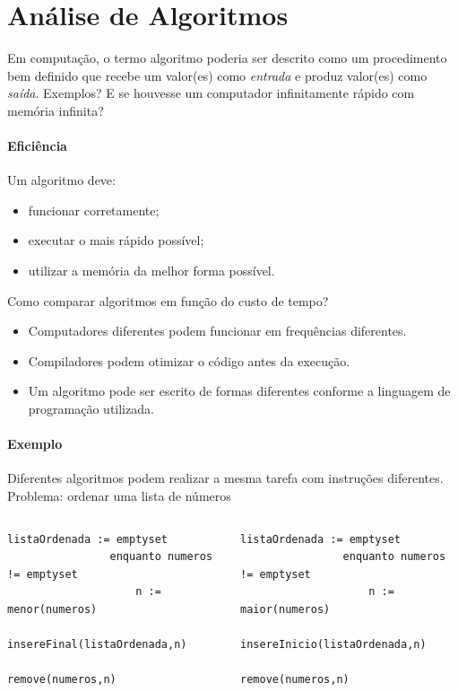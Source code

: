 \section{Análise de Algoritmos}%
\begin{frame}[label=main]
	Em computação, o termo \alert{algoritmo} poderia ser descrito como um procedimento 
	bem definido que recebe um valor(es) como \emph{entrada} e produz valor(es)
	como \emph{saída}.
	\vfill\pause
	Exemplos?
	\vfill\pause
	E se houvesse um computador infinitamente rápido com memória infinita?
\end{frame}

\begin{frame}[label=main]
	\framesubtitle{Eficiência}

	Um algoritmo deve:
	\begin{itemize}
		\item funcionar corretamente;
		\item executar o mais rápido possível;
		\item utilizar a memória da melhor forma possível.
	\end{itemize}
	\vfill\pause
	Como comparar algoritmos em função do custo de tempo?
	\begin{itemize}
		\item Computadores diferentes podem funcionar em frequências diferentes.
		\item Compiladores podem otimizar o código antes da execução.
		\item Um algoritmo pode ser escrito de formas diferentes conforme a 
		linguagem de programação utilizada.
	\end{itemize}
\end{frame}

\begin{frame}[fragile,label=graduacao]
	\framesubtitle{Exemplo}

	Diferentes algoritmos podem realizar a mesma tarefa com instruções diferentes.
	\vfill
	Problema: ordenar uma lista de números
	\vfill\pause
	\begin{columns}[T]
			\begin{lstlisting}[morekeywords={menor,insereFinal,remove}]
				listaOrdenada := emptyset
				enquanto numeros != emptyset
				    n := menor(numeros)
				    insereFinal(listaOrdenada,n)
				    remove(numeros,n)
			\end{lstlisting}
			\begin{lstlisting}[morekeywords={maior,insereInicio,remove}]
				listaOrdenada := emptyset
				enquanto numeros != emptyset
				    n := maior(numeros)
				    insereInicio(listaOrdenada,n)
				    remove(numeros,n)
			\end{lstlisting}
	\end{columns}
\end{frame}


